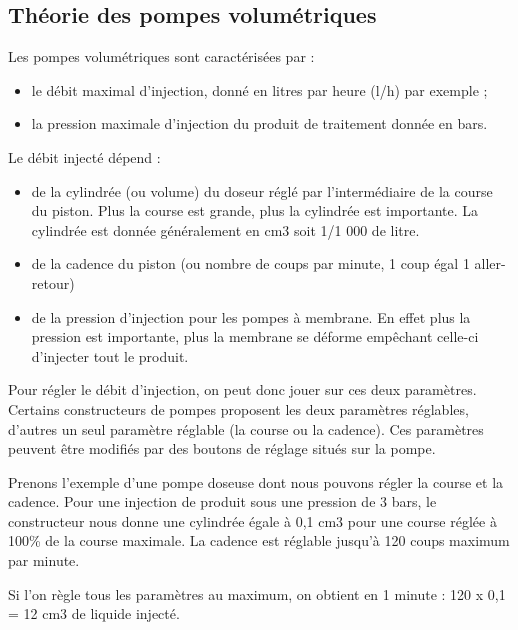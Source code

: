 \subsection{Théorie des pompes volumétriques} 

Les pompes volumétriques sont caractérisées par :

 \begin{itemize}
\item  le débit maximal d’injection, donné en litres par heure (l/h) par exemple ;
\item  la pression maximale d’injection du produit de traitement donnée en bars.

\end{itemize}


Le débit injecté dépend :
 \begin{itemize}
\item  de la cylindrée (ou volume) du doseur réglé par l’intermédiaire de la course du piston. Plus la course est grande, plus la cylindrée est importante. La cylindrée est donnée généralement en cm3 soit 1/1 000 de litre.
\item  de la cadence du piston (ou nombre de coups par minute, 1 coup égal 1 aller-retour)
\item  de la pression d’injection pour les pompes à membrane. En effet plus la pression est importante, plus la membrane se déforme empêchant celle-ci d’injecter tout le produit.

\end{itemize}


Pour régler le débit d’injection, on peut donc jouer sur ces deux paramètres. Certains constructeurs de pompes proposent les deux paramètres réglables, d’autres un seul paramètre réglable (la course ou la cadence). Ces paramètres peuvent être modifiés par des boutons de réglage situés sur la pompe.
\vspace{0.3cm}

Prenons l’exemple d’une pompe doseuse dont nous pouvons régler la course et la cadence. Pour une injection de produit sous une pression de 3 bars, le constructeur nous donne une cylindrée égale à 0,1 cm3 pour une course réglée à 100\% de la course maximale. La cadence est réglable jusqu’à 120 coups maximum par minute.



\vspace{0.3cm}
Si l’on règle tous les paramètres au maximum, on obtient en 1 minute : 
120 x 0,1 = 12 cm3 de liquide injecté.

